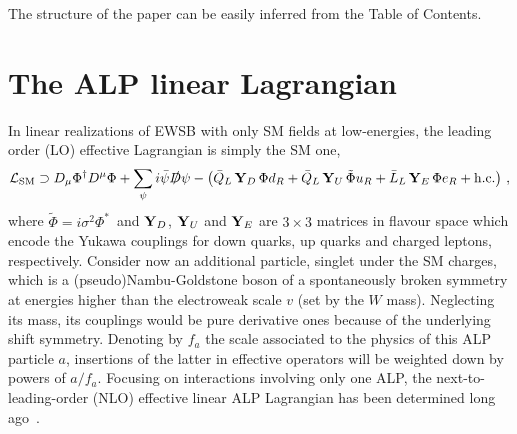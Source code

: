 \documentclass[11pt]{article}
\newcommand{\s}{\sigma}
\renewcommand{\L}{\mathcal{L}}
\newcommand{\hc}{\mathrm{h.c.}}
\renewcommand{\[}{\begin{equation}}
\renewcommand{\]}{\end{equation}}
\def\cY{{\bf Y}}
\def\cY{{\bf Y}}
\begin{document}
 The structure of the paper can be easily inferred from the Table of Contents.


\section{ The ALP linear Lagrangian}
\label{Sect:2pointF_linear}
In linear realizations of EWSB with only SM fields at low-energies,  the leading order (LO) effective Lagrangian  is simply the SM one, 
\begin{equation}\label{LSM_lin}
\L_\text{SM} \supset D_\mu\Phi^\dag D^\mu\Phi+\sum_\psi i\bar{\psi}\slashed{D}\psi-\left(\bar{Q}_L\,\cY_D\,\Phi d_R+\bar{Q}_L\,\cY_U\,\tilde\Phi u_R+\bar{L}_L\,\cY_E\,\Phi e_R+\hc\right)\,,
\end{equation}
where $\tilde{\Phi}=i\s^2\Phi^*$\, and 
  $\cY_D$, $\cY_U$ and $\cY_E$ are $3\times 3$ matrices in flavour space which encode the Yukawa couplings for down quarks, up quarks 
  and charged leptons, respectively.  Consider now an additional particle, singlet under the SM charges, which is a (pseudo)Nambu-Goldstone boson of a 
  spontaneously broken symmetry at energies higher than the electroweak scale $v$ (set by the $W$ mass).  Neglecting its mass, its couplings would be pure derivative ones 
  because of the underlying shift symmetry. Denoting by $f_a$ the scale associated to the physics of this ALP particle $a$,  insertions of the 
  latter in effective operators will be weighted down by powers of $a/f_a$. Focusing on interactions involving only one ALP, 
  the next-to-leading-order (NLO) effective linear ALP Lagrangian has been determined long ago~\cite{Georgi:1986df}. 
\end{document}
